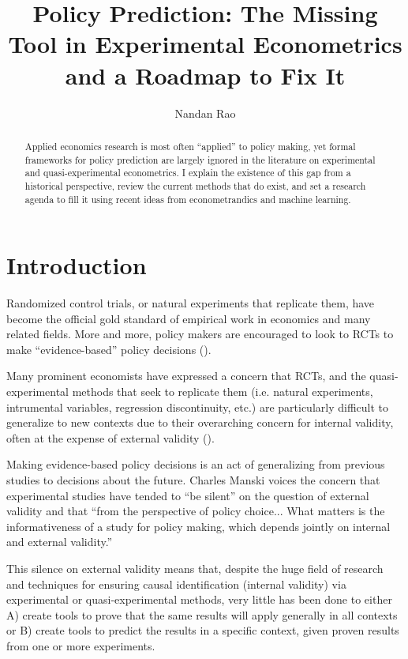 \documentclass[a4paper,12pt]{article}
\title{ Policy Prediction: The Missing Tool in Experimental Econometrics and a Roadmap to Fix It  }
\author{Nandan Rao}
\begin{document}
\maketitle


\begin{abstract}
Applied economics research is most often ``applied'' to policy making, yet formal frameworks for policy prediction are largely ignored in the literature on experimental and quasi-experimental econometrics. I explain the existence of this gap from a historical perspective, review the current methods that do exist, and set a research agenda to fill it using recent ideas from econometrandics and machine learning. 
\end{abstract}


\section{Introduction}

Randomized control trials, or natural experiments that replicate them, have become the official gold standard of empirical work in economics and many related fields. More and more, policy makers are encouraged to look to RCTs to make ``evidence-based'' policy decisions (\cite{Manski2013, Cartwright2013}). 

Many prominent economists have expressed a concern that RCTs, and the quasi-experimental methods that seek to replicate them (i.e. natural experiments, intrumental variables, regression discontinuity, etc.) are particularly difficult to generalize to new contexts due to their overarching concern for internal validity, often at the expense of external validity (\cite{Heckman1995, Heckman2008, Deaton2010, Manski2013, Deaton2018}). 

Making evidence-based policy decisions is an act of generalizing from previous studies to decisions about the future. Charles Manski \parencite*{Manski2013} voices the concern that experimental studies have tended to ``be silent'' on the question of external validity and that ``from the perspective of policy choice... What matters is the informativeness of a study for policy making, which depends jointly on internal and external validity.''

This silence on external validity means that, despite the huge field of research and techniques for ensuring causal identification (internal validity) via experimental or quasi-experimental methods, very little has been done to either A) create tools to prove that the same results will apply generally in all contexts or B) create tools to predict the results in a specific context, given proven results from one or more experiments. 
\end{document}
